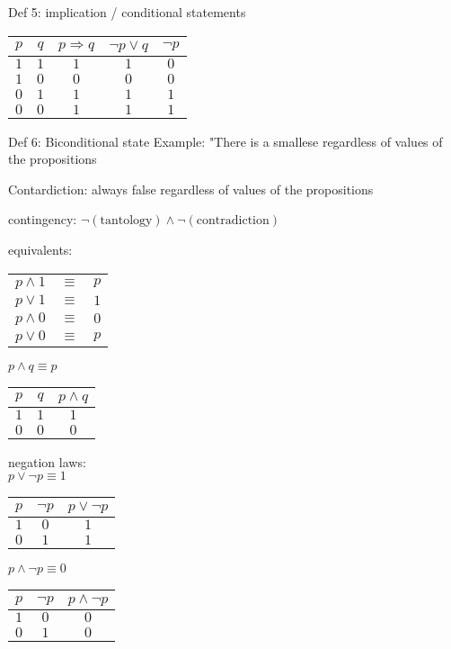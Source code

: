 \documentclass{article}
\begin{document}
Def 5: implication / conditional statements \\
\begin{tabular}{cc|c||c||c}
  $p$ & $q$ & $p \Rightarrow q$ & $\neg p \vee q$ & $\neg p$ \\ \hline
  $1$ & $1$ & $1$ & $1$ & $0$ \\
  $1$ & $0$ & $0$ & $0$ & $0$ \\
  $0$ & $1$ & $1$ & $1$ & $1$ \\
  $0$ & $0$ & $1$ & $1$ & $1$
\end{tabular}

Def 6: Biconditional state
Example: "There is a smallese regardless of values of the propositions

Contardiction: always false regardless of values of the propositions

contingency: $\neg \left(\text{tantology}\right) \wedge \neg \left(\text{contradiction}\right)$

equivalents:\\
\begin{tabular}{ccc}
  $p \wedge 1$ & $\equiv$ & $p$ \\
  $p \vee 1$ & $\equiv$ & $1$ \\
  $p \wedge 0$ & $\equiv$ & $0$ \\
  $p \vee 0$ & $\equiv$ & $p$
\end{tabular}

$p \wedge q \equiv p$\\
\begin{tabular}{cc|c}
  $p$ & $q$ & $p \wedge q$ \\ \hline
  $1$ & $1$ & $1$ \\
  $0$ & $0$ & $0$ \\
\end{tabular}

negation laws:\\
$p \vee \neg p \equiv 1$ \\
\begin{tabular}{cc|c}
  $p$ & $\neg p$ & $p \vee \neg p$ \\ \hline
  $1$ & $0$ & $1$ \\
  $0$ & $1$ & $1$ \\
\end{tabular}

$p \wedge \neg p \equiv 0$ \\
\begin{tabular}{cc|c}
  $p$ & $\neg p$ & $p \wedge \neg p$ \\ \hline
  $1$ & $0$ & $0$ \\
  $0$ & $1$ & $0$ \\
\end{tabular}
\end{document}
